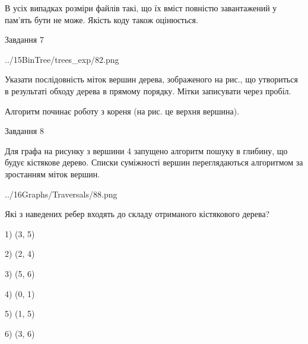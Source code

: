 \documentclass[12pt, ukrainian]{article}
\begin{document}
{В усіх випадках розміри файлів такі, що їх вміст повністю завантажений у пам'ять бути не може. Якість коду також оцінюється.



\vspace{10mm}\par

\newpage
\begin{minipage}[t]{9.7cm}
               
{\begin{center}Завдання {7}\end{center}}
\vspace{-4mm}

\begin{center}
	{../15BinTree/trees_exp/82.png}
\end{center}
Указати послідовність міток вершин дерева, зображеного на рис., що утвориться в результаті обходу дерева в прямому порядку. Мітки записувати через пробіл.\par Алгоритм починає роботу з кореня (на рис. це верхня вершина).\par

\end{minipage}
\vline \hspace{8mm}
\begin{minipage}[t]{8.0cm}
               
{\begin{center}Завдання {8}\end{center}}
\vspace{-4mm}
Для графа на рисунку з вершини 4 запущено алгоритм пошуку в глибину, що будує кістякове дерево. Списки суміжності вершин переглядаються алгоритмом за зростанням міток вершин.\par
\begin{center}
	{../16Graphs/Traversals/88.png}
\end{center}
\par Які з наведених ребер входять до складу отриманого кістякового дерева?\par
1) (3, 5)\par
2) (2, 4)\par
3) (5, 6)\par
4) (0, 1)\par
5) (1, 5)\par
6) (3, 6)\par
{\vskip 15pt} \par


\end{minipage}}
\end{document}
